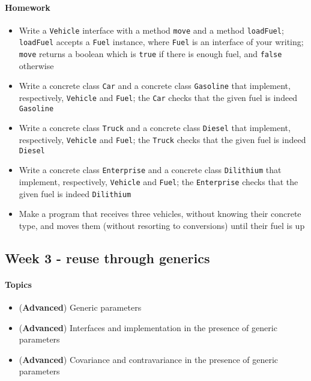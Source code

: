 \documentclass[12pt,a4paper,draft]{article}
\begin{document}
		\paragraph*{Homework}
		\begin{itemize}
			\item Write a \texttt{Vehicle} interface with a method \texttt{move} and a method \texttt{loadFuel}; \texttt{loadFuel} accepts a \texttt{Fuel} instance, where \texttt{Fuel} is an interface of your writing; \texttt{move} returns a boolean which is \texttt{true} if there is enough fuel, and \texttt{false} otherwise
			\item Write a concrete class \texttt{Car} and a concrete class \texttt{Gasoline} that implement, respectively, \texttt{Vehicle} and \texttt{Fuel}; the \texttt{Car} checks that the given fuel is indeed \texttt{Gasoline}
			\item Write a concrete class \texttt{Truck} and a concrete class \texttt{Diesel} that implement, respectively, \texttt{Vehicle} and \texttt{Fuel}; the \texttt{Truck} checks that the given fuel is indeed \texttt{Diesel}
			\item Write a concrete class \texttt{Enterprise} and a concrete class \texttt{Dilithium} that implement, respectively, \texttt{Vehicle} and \texttt{Fuel}; the \texttt{Enterprise} checks that the given fuel is indeed \texttt{Dilithium}
			\item Make a program that receives three vehicles, without knowing their concrete type, and moves them (without resorting to conversions) until their fuel is up
		\end{itemize}
		
		\subsection{Week 3 - reuse through generics}
		\paragraph*{Topics}			
		\begin{itemize}
			\item (\textbf{Advanced}) Generic parameters
			\item (\textbf{Advanced}) Interfaces and implementation in the presence of generic parameters
			\item (\textbf{Advanced}) Covariance and contravariance in the presence of generic parameters
		\end{itemize}
		
\end{document}

